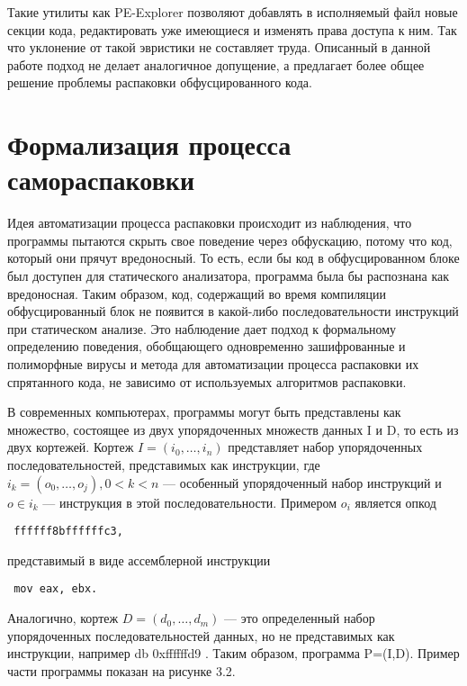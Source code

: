 \documentclass[oneside, final, 14pt]{extreport}
\begin{document}
Такие утилиты как PE-Explorer \cite{peexplorer} позволяют добавлять в исполняемый файл новые секции кода, редактировать уже имеющиеся и изменять права доступа к ним. Так что уклонение от такой эвристики не составляет труда. Описанный в данной работе подход не делает аналогичное допущение, а предлагает более общее решение проблемы распаковки обфусцированного кода.

\section{Формализация процесса самораспаковки}

Идея автоматизации процесса распаковки происходит из наблюдения, что программы пытаются скрыть свое поведение через обфускацию, потому что код, который они прячут вредоносный. То есть, если бы код в обфусцированном блоке был доступен для статического анализатора,  программа была бы распознана как вредоносная. Таким образом, код, содержащий во время компиляции обфусцированный блок не появится в какой-либо последовательности инструкций при статическом анализе. Это наблюдение дает подход к формальному определению поведения, обобщающего одновременно зашифрованные и полиморфные вирусы и метода для автоматизации процесса распаковки их спрятанного кода, не зависимо от используемых алгоритмов распаковки. 


В современных компьютерах, программы могут быть представлены как множество,  состоящее из двух упорядоченных множеств данных I и D, то есть из двух кортежей. Кортеж \(I=(i_0,\ldots , i_n)\) представляет набор упорядоченных последовательностей, представимых как  инструкции, где \(i_k=(o_0,\ldots , o_j) , 0<k<n\) --- особенный упорядоченный набор инструкций и \(o \in i_k\) ---  инструкция в этой последовательности. Примером \(o_i\) является опкод \begin{verbatim} ffffff8bffffffc3, \end{verbatim} представимый в виде ассемблерной инструкции \begin{verbatim} mov eax, ebx. \end{verbatim} Аналогично, кортеж \(D=(d_0,\ldots , d_m)\) --- это определенный набор упорядоченных последовательностей данных, но не представимых как инструкции, например db 0xffffffd9 . Таким образом, программа P=(I,D). Пример части программы показан на рисунке 3.2. 
\end{document}
